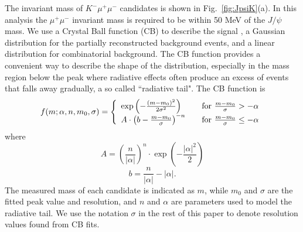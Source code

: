 \documentclass[12pt,a4paper]{article}
\begin{document}
The invariant mass of $K^-\mu^+\mu^-$ candidates is shown in Fig.~\ref{fig:JpsiK}(a). In this analysis the  $\mu^+\mu^-$ invariant mass is required to be within 50 MeV of the $J/\psi$ mass. 
We use a Crystal Ball function (CB) to describe the signal \cite{Skwarnicki:1986xj}, a Gaussian distribution for the partially reconstructed background events,  and a linear distribution for combinatorial background. The CB function provides a convenient way to describe the shape of the distribution, especially in the mass region below the peak where radiative effects often produce an excess of events that falls away gradually, a so called ``radiative tail".
The CB function is
\begin{equation}
f(m;\alpha,n, {m}_0,\sigma) = \left\{
\begin{array}{l l}
 \exp\left(-\frac{(m-m_0)^2}{2\sigma^2}\right)  & \quad \mbox{for $\frac{m-m_0}{\sigma}>-\alpha$}\\
  A\cdot \left(b-\frac{m-m_0}{\sigma}\right)^{-n} & \quad \mbox{for $\frac{m-m_0}{\sigma}\le-\alpha$}\\ \end{array} \right. 
  \end{equation}
 where
 \[A=\left(\frac{n}{|\alpha|}\right)^n\cdot\exp\left(-\frac{|\alpha|^2}{2}\right)\]
 \begin{equation}
b=\frac{n}{|\alpha|}-|\alpha|.\nonumber
\end{equation}
The measured mass of each candidate is indicated as $m$, while $m_0$ and  $\sigma$ are the fitted peak value and resolution, and $n$ and $\alpha$ are parameters used to model the radiative tail.  We use the notation $\sigma$ in the rest of this paper to denote resolution values found from CB fits.
\end{document}
